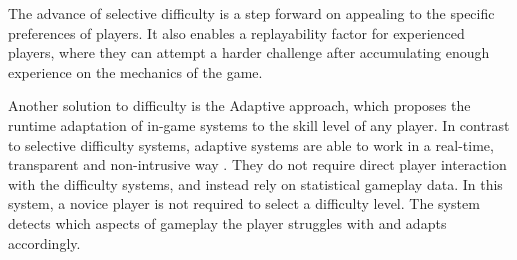 The advance of selective difficulty is a step forward on appealing to the specific preferences of players. It also enables a replayability factor for experienced players, where they can attempt a harder challenge after accumulating enough experience on the mechanics of the game. 

Another solution to difficulty is the Adaptive approach, which proposes the runtime adaptation of in-game systems to the skill level of any player. In contrast to selective difficulty systems, adaptive systems are able to work in a real-time, transparent and non-intrusive way \cite{PHD_DynamicDifficultyAdjustment}. They do not require direct player interaction with the difficulty systems, and instead rely on statistical gameplay data. In this system, a novice player is not required to select a difficulty level. The system detects which aspects of gameplay the player struggles with and adapts accordingly.